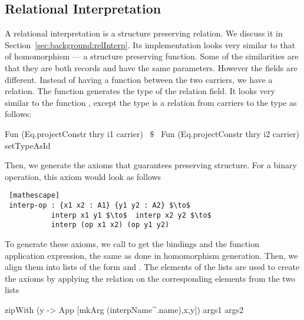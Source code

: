 \subsection{Relational Interpretation}
\label{sec:generation:relInterp}
A relational interpretation is a structure preserving relation. We discuss it in Section~\ref{sec:background:relInterp}.  
Its implementation looks very similar to that of homomorphism --- a structure preserving function. Some of the similarities are that they are both records and have the same parameters. However the fields are different. Instead of having a function between the two carriers, we have a relation. The function  generates the type of the relation field. It looks very similar to the function , except the type is a relation from carriers to the type  as follows: 
\begin{hscode} 
Fun (Eq.projectConstr thry i1 carrier) ~$\$$~ 
     Fun (Eq.projectConstr thry i2 carrier) setTypeAsId
\end{hscode} 
Then, we generate the axioms that guarantees preserving structure. For a binary operation, this axiom would look as follows 
\begin{lstlisting} [mathescape]
 interp-op : {x1 x2 : A1} {y1 y2 : A2} $\to$ 
           interp x1 y1 $\to$  interp x2 y2 $\to$ 
           interp (op x1 x2) (op y1 y2)
\end{lstlisting}
\noindent To generate these axioms, we call  to get the bindings and the function application expression, the same as done in homomorphism generation. Then, we align them into lists of the form \lstmath{[x1,x2,op x1 x2]} and \lstmath{[y1,y2,op y1 y2]}. The elements of the lists are used to create the axioms by applying the relation on the corresponding elements from the two lists 
\begin{hscode} 
 zipWith (\x y -> App [mkArg (interpName^.name),x,y]) args1 args2 
\end{hscode}



